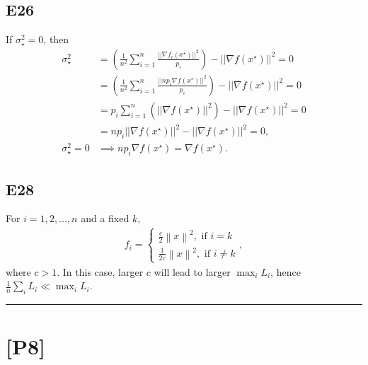 \documentclass[12pt]{article}
\begin{document}
\subsection*{E26}
If $\sigma^2_\star = 0$, then
\begin{equation*}
    \begin{split}
        \sigma^2_\star &= \left(\frac{1}{n^2} \sum_{i=1}^n \frac{||\nabla f_i(x^\star)||^2}{p_i}\right) - ||\nabla f(x^\star)||^2 = 0 \\
        &= \left(\frac{1}{n^2} \sum_{i=1}^n \frac{||np_i \nabla f(x^\star)||^2}{p_i}\right) - ||\nabla f(x^\star)||^2 = 0\\
        &= p_i \sum_{i=1}^n (|| \nabla f(x^\star) ||^2) - ||\nabla f(x^\star)||^2 = 0\\
        &= np_i || \nabla f(x^\star) ||^2 - ||\nabla f(x^\star)||^2 = 0, \\
        \sigma^2_\star = 0 &\implies np_i \nabla f(x^\star) = \nabla f(x^\star).
    \end{split}
\end{equation*}
\vspace{0.1cm}
\subsection*{E28}
For $i=1,2,...,n$ and a fixed $k$,
\begin{equation*}
    \begin{split}
        f_i =
        \begin{cases}
            \frac{c}{2}\left\| x \right\|^2, \text{ if }i=k \\
            \frac{1}{2c}\left\| x \right\|^2, \text{ if }i \neq k
        \end{cases}
        ,
    \end{split}
\end{equation*}
where $c > 1$. In this case, larger $c$ will lead to larger $\max_i L_i$, hence $\frac{1}{n} \sum_i L_i \ll \max_i L_i$. 
\vspace{0.1cm}

\hrule
\vspace{0.1cm}
\section*{[P8]}
\end{document}
